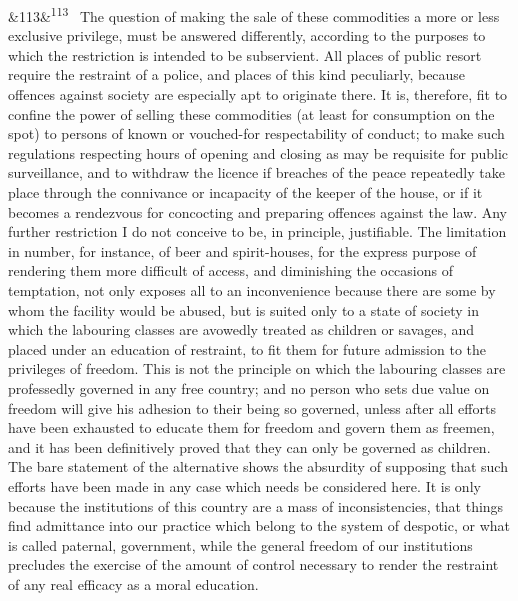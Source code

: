 \documentclass[12pt]{article}
\newcommand{\para}[1][]{\par\noindent\ifx&#1&\else\textsuperscript{\footnotesize #1}~\fi}
\begin{document}
\para[113] The question of making the sale of these commodities a more or less exclusive privilege, must be answered differently, according to the purposes to which the restriction is intended to be subservient. All places of public resort require the restraint of a police, and places of this kind peculiarly, because offences against society are especially apt to originate there. It is, therefore, fit to confine the power of selling these commodities (at least for consumption on the spot) to persons of known or vouched-for respectability of conduct; to make such regulations respecting hours of opening and closing as may be requisite for public surveillance, and to withdraw the licence if breaches of the peace repeatedly take place through the connivance or incapacity of the keeper of the house, or if it becomes a rendezvous for concocting and preparing offences against the law. Any further restriction I do not conceive to be, in principle, justifiable. The limitation in number, for instance, of beer and spirit-houses, for the express purpose of rendering them more difficult of access, and diminishing the occasions of temptation, not only exposes all to an inconvenience because there are some by whom the facility would be abused, but is suited only to a state of society in which the labouring classes are avowedly treated as children or savages, and placed under an education of restraint, to fit them for future admission to the privileges of freedom. This is not the principle on which the labouring classes are professedly governed in any free country; and no person who sets due value on freedom will give his adhesion to their being so governed, unless after all efforts have been exhausted to educate them for freedom and govern them as freemen, and it has been definitively proved that they can only be governed as children. The bare statement of the alternative shows the absurdity of supposing that such efforts have been made in any case which needs be considered here. It is only because the institutions of this country are a mass of inconsistencies, that things find admittance into our practice which belong to the system of despotic, or what is called paternal, government, while the general freedom of our institutions precludes the exercise of the amount of control necessary to render the restraint of any real efficacy as a moral education.
\end{document}
